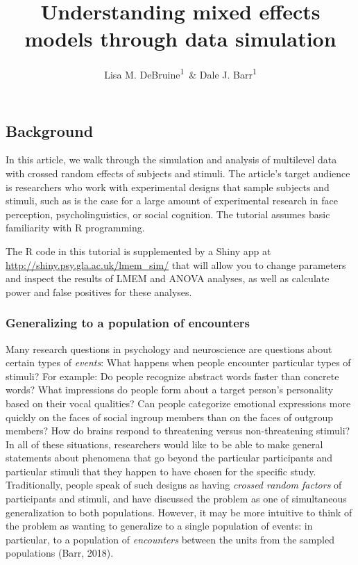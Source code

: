 \documentclass[man,floatsintext]{apa6}
\title{Understanding mixed effects models through data simulation}
\author{Lisa M. DeBruine\textsuperscript{1}~\& Dale J. Barr\textsuperscript{1}}
\date{}
\affiliation{
\vspace{0.5cm}
\textsuperscript{1} Institute of Neuroscience and Psychology, University of Glasgow}
\begin{document}
\maketitle

\hypertarget{background}{%
\subsection{Background}\label{background}}

In this article, we walk through the simulation and analysis of multilevel data with crossed random effects of subjects and stimuli. The article's target audience is researchers who work with experimental designs that sample subjects and stimuli, such as is the case for a large amount of experimental research in face perception, psycholinguistics, or social cognition. The tutorial assumes basic familiarity with R programming.

The R code in this tutorial is supplemented by a Shiny app at \url{http://shiny.psy.gla.ac.uk/lmem_sim/} that will allow you to change parameters and inspect the results of LMEM and ANOVA analyses, as well as calculate power and false positives for these analyses.

\hypertarget{generalizing-to-a-population-of-encounters}{%
\subsubsection{Generalizing to a population of encounters}\label{generalizing-to-a-population-of-encounters}}

Many research questions in psychology and neuroscience are questions about certain types of \emph{events}: What happens when people encounter particular types of stimuli? For example: Do people recognize abstract words faster than concrete words? What impressions do people form about a target person's personality based on their vocal qualities? Can people categorize emotional expressions more quickly on the faces of social ingroup members than on the faces of outgroup members? How do brains respond to threatening versus non-threatening stimuli? In all of these situations, researchers would like to be able to make general statements about phenomena that go beyond the particular participants and particular stimuli that they happen to have chosen for the specific study. Traditionally, people speak of such designs as having \emph{crossed random factors} of participants and stimuli, and have discussed the problem as one of simultaneous generalization to both populations. However, it may be more intuitive to think of the problem as wanting to generalize to a single population of events: in particular, to a population of \emph{encounters} between the units from the sampled populations (Barr, 2018).
\end{document}
